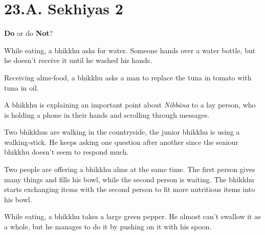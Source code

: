\chapter{23.A. Sekhiyas 2}
\renewcommand*{\theChapterTitle}{23.A. Sekhiyas 2}

\begin{exam}{\autoExamName}

  \begin{problem*}
    \textbf{Do} or do \textbf{Not}?

    \bigskip

    \begin{parts}

    \item {} While eating, a bhikkhu asks for water. Someone hands over a
      water bottle, but he doesn't receive it until he washed his hands.

    \bigskip

    \item {} Receiving alms-food, a bhikkhu asks a man to replace the tuna
      in tomato with tuna in oil.

    \bigskip

    \item {} A bhikkhu is explaining an important point about \emph{Nibbāna}
    to a lay person, who is holding a phone in their hands and scrolling through
    messages.

    \bigskip

    \item {} Two bhikkhus are walking in the countryside, the junior bhikkhu
    is using a walking-stick. He keeps asking one question after another since
    the seniour bhikkhu doesn't seem to respond much.

    \bigskip

    \item {} Two people are offering a bhikkhu alms at the same time. The
      first person gives many things and fills his bowl, while the second person
      is waiting. The bhikkhu starts exchanging items with the second person to
      fit more nutritious items into his bowl.

    \bigskip

    \item {} While eating, a bhikkhu takes a large green pepper. He almost
    can't swallow it as a whole, but he manages to do it by pushing on it with
    his spoon.

    \bigskip


\end{parts}
\end{problem*}
\end{exam}
